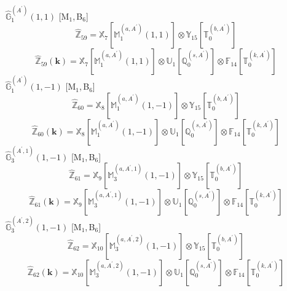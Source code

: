 \documentclass[fleqn,10pt,landscape]{article}
\begin{document}
\begin{itemize}
\noindent {} $\,\,\,\hat{\mathbb{G}}_{1}^{(A^{\prime})}(1,1)$ [M$_{1}$,\,B$_{6}$]
\begin{dmath*}
\hat{\mathbb{Z}}_{59}=\mathbb{X}_{7}[\mathbb{M}_{1}^{(a,A^{\prime})}(1,1)] \otimes\mathbb{Y}_{15}[\mathbb{T}_{0}^{(b,A^{\prime})}]
\end{dmath*}
\begin{dmath*}
\hat{\mathbb{Z}}_{59}(\bm{k})=\mathbb{X}_{7}[\mathbb{M}_{1}^{(a,A^{\prime})}(1,1)] \otimes\mathbb{U}_{1}[\mathbb{Q}_{0}^{(s,A^{\prime})}] \otimes\mathbb{F}_{14}[\mathbb{T}_{0}^{(k,A^{\prime})}]
\end{dmath*}
\vspace{4mm}
\noindent {} $\,\,\,\hat{\mathbb{G}}_{1}^{(A^{\prime})}(1,-1)$ [M$_{1}$,\,B$_{6}$]
\begin{dmath*}
\hat{\mathbb{Z}}_{60}=\mathbb{X}_{8}[\mathbb{M}_{1}^{(a,A^{\prime})}(1,-1)] \otimes\mathbb{Y}_{15}[\mathbb{T}_{0}^{(b,A^{\prime})}]
\end{dmath*}
\begin{dmath*}
\hat{\mathbb{Z}}_{60}(\bm{k})=\mathbb{X}_{8}[\mathbb{M}_{1}^{(a,A^{\prime})}(1,-1)] \otimes\mathbb{U}_{1}[\mathbb{Q}_{0}^{(s,A^{\prime})}] \otimes\mathbb{F}_{14}[\mathbb{T}_{0}^{(k,A^{\prime})}]
\end{dmath*}
\vspace{4mm}
\noindent {} $\,\,\,\hat{\mathbb{G}}_{3}^{(A^{\prime},1)}(1,-1)$ [M$_{1}$,\,B$_{6}$]
\begin{dmath*}
\hat{\mathbb{Z}}_{61}=\mathbb{X}_{9}[\mathbb{M}_{3}^{(a,A^{\prime},1)}(1,-1)] \otimes\mathbb{Y}_{15}[\mathbb{T}_{0}^{(b,A^{\prime})}]
\end{dmath*}
\begin{dmath*}
\hat{\mathbb{Z}}_{61}(\bm{k})=\mathbb{X}_{9}[\mathbb{M}_{3}^{(a,A^{\prime},1)}(1,-1)] \otimes\mathbb{U}_{1}[\mathbb{Q}_{0}^{(s,A^{\prime})}] \otimes\mathbb{F}_{14}[\mathbb{T}_{0}^{(k,A^{\prime})}]
\end{dmath*}
\vspace{4mm}
\noindent {} $\,\,\,\hat{\mathbb{G}}_{3}^{(A^{\prime},2)}(1,-1)$ [M$_{1}$,\,B$_{6}$]
\begin{dmath*}
\hat{\mathbb{Z}}_{62}=\mathbb{X}_{10}[\mathbb{M}_{3}^{(a,A^{\prime},2)}(1,-1)] \otimes\mathbb{Y}_{15}[\mathbb{T}_{0}^{(b,A^{\prime})}]
\end{dmath*}
\begin{dmath*}
\hat{\mathbb{Z}}_{62}(\bm{k})=\mathbb{X}_{10}[\mathbb{M}_{3}^{(a,A^{\prime},2)}(1,-1)] \otimes\mathbb{U}_{1}[\mathbb{Q}_{0}^{(s,A^{\prime})}] \otimes\mathbb{F}_{14}[\mathbb{T}_{0}^{(k,A^{\prime})}]

\end{dmath*}
\end{itemize}
\end{document}
